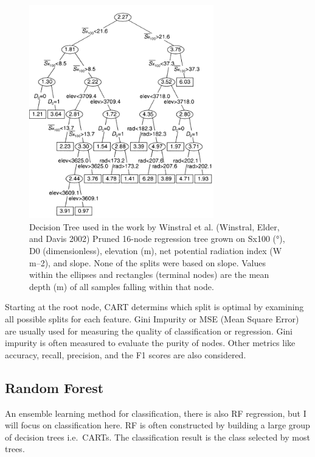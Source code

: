 \documentclass[
  letterpaper,
  DIV=11,
  numbers=noendperiod]{scrreprt}
\begin{document}
\begin{figure}

{\centering \includegraphics[width=3.15625in,height=\textheight]{images/wk7/tree.png}

}

\caption{Decision Tree used in the work by Winstral et al. (Winstral,
Elder, and Davis 2002) Pruned 16-node regression tree grown on Sx100
(°), D0 (dimensionless), elevation (m), net potential radiation index (W
m--2), and slope. None of the splits were based on slope. Values within
the ellipses and rectangles (terminal nodes) are the mean depth (m) of
all samples falling within that node.}

\end{figure}

Starting at the root node, CART determins which split is optimal by
examining all possible splits for each feature. Gini Impurity or MSE
(Mean Square Error) are usually used for measuring the quality of
classification or regression. Gini impurity is often measured to
evaluate the purity of nodes. Other metrics like accuracy, recall,
precision, and the F1 scores are also considered.

\hypertarget{random-forest}{%
\subsection*{Random Forest}\label{random-forest}}

An ensemble learning method for classification, there is also RF
regression, but I will focus on classification here. RF is often
constructed by building a large group of decision trees i.e.~CARTs. The
classification result is the class selected by most trees.
\end{document}
